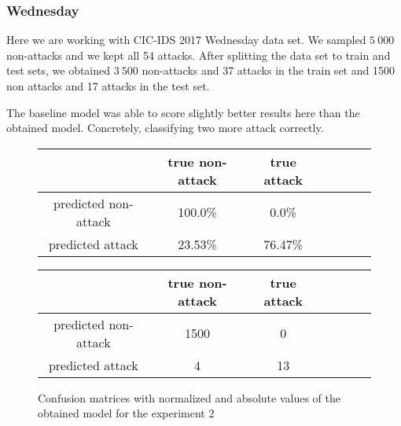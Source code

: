 \documentclass{article}
\begin{document}
\clearpage



\subsubsection{Wednesday}
Here we are working with CIC-IDS 2017 Wednesday data set. We sampled $5\ 000$ non-attacks and we kept all 54 attacks. After splitting the data set to train and test sets, we obtained $3\ 500$ non-attacks and 37 attacks in the train set and 1500 non attacks and 17 attacks in the test set.

The baseline model was able to score slightly better results here than the obtained model. Concretely, classifying two more attack correctly.

\begin{figure}[h!]
    \centering
    \begin{tabular}{ |c|c|c|c|c|c|c| }
     \hline
      & true non-attack & true attack \\
     \hline
     predicted non-attack & 100.0\% & 0.0\% \\
     \hline
     predicted attack & 23.53\% & 76.47\% \\
     \hline
    \end{tabular}

    \vspace{0.2cm}

    \centering
    \begin{tabular}{ |c|c|c|c|c|c|c| }
     \hline
      & true non-attack & true attack \\
     \hline
     predicted non-attack & 1500 & 0 \\
     \hline
     predicted attack & 4 & 13 \\
     \hline
    \end{tabular}
    \caption{Confusion matrices with normalized and absolute values of the obtained model for the experiment 2}
    \label{fig-exp2-transcriptions}
\end{figure}
\end{document}
